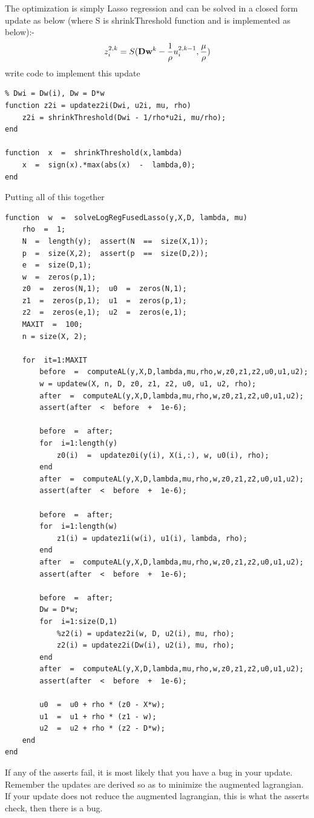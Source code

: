 \documentclass{article}
\begin{document}
{The optimization is simply Lasso regression and can be solved in a closed form update as below (where S is shrinkThreshold function and is implemented as below):-
\[
z_i^{2,k} = S(\mathbf{D}\mathbf{w}^{k} - \frac{1}{\rho}u_{i}^{2, k-1}, \frac{\mu}{\rho}) 
\]
write code to implement this update
\begin{verbatim}
% Dwi = Dw(i), Dw = D*w
function z2i = updatez2i(Dwi, u2i, mu, rho)    
    z2i = shrinkThreshold(Dwi - 1/rho*u2i, mu/rho);
end

function  x  =  shrinkThreshold(x,lambda)
    x  =  sign(x).*max(abs(x)  -  lambda,0);
end
\end{verbatim}

\newproblem{2pt} Putting all of this together
\begin{verbatim}
function  w  =  solveLogRegFusedLasso(y,X,D, lambda, mu)
    rho  =  1;
    N  =  length(y);  assert(N  ==  size(X,1));
    p  =  size(X,2);  assert(p  ==  size(D,2));
    e  =  size(D,1);
    w  =  zeros(p,1);
    z0  =  zeros(N,1);  u0  =  zeros(N,1);
    z1  =  zeros(p,1);  u1  =  zeros(p,1);
    z2  =  zeros(e,1);  u2  =  zeros(e,1);
    MAXIT  =  100;
    n = size(X, 2);
    
    for  it=1:MAXIT
        before  =  computeAL(y,X,D,lambda,mu,rho,w,z0,z1,z2,u0,u1,u2);        
        w = updatew(X, n, D, z0, z1, z2, u0, u1, u2, rho);
        after  =  computeAL(y,X,D,lambda,mu,rho,w,z0,z1,z2,u0,u1,u2);
        assert(after  <  before  +  1e-6);
        
        before  =  after;
        for  i=1:length(y)
            z0(i)  =  updatez0i(y(i), X(i,:), w, u0(i), rho);
        end
        after  =  computeAL(y,X,D,lambda,mu,rho,w,z0,z1,z2,u0,u1,u2);
        assert(after  <  before  +  1e-6);
        
        before  =  after;
        for  i=1:length(w)            
            z1(i) = updatez1i(w(i), u1(i), lambda, rho);
        end
        after  =  computeAL(y,X,D,lambda,mu,rho,w,z0,z1,z2,u0,u1,u2);
        assert(after  <  before  +  1e-6);
        
        before  =  after;
        Dw = D*w;
        for  i=1:size(D,1)            
            %z2(i) = updatez2i(w, D, u2(i), mu, rho);
            z2(i) = updatez2i(Dw(i), u2(i), mu, rho);
        end
        after  =  computeAL(y,X,D,lambda,mu,rho,w,z0,z1,z2,u0,u1,u2);
        assert(after  <  before  +  1e-6);
        
        u0  =  u0 + rho * (z0 - X*w);
        u1  =  u1 + rho * (z1 - w);
        u2  =  u2 + rho * (z2 - D*w);
    end        
end
\end{verbatim}
If any of the asserts fail, it is most likely that you have a bug in your update. Remember the updates are derived so as to minimize the augmented lagrangian. If your update does not reduce the augmented lagrangian, this is what the asserts check, then there is a bug.

}
\end{document}
